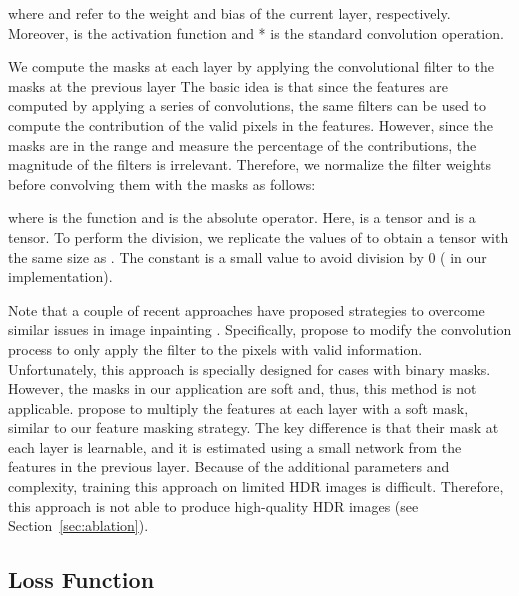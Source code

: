 \vspace{-8pt}

\vspace{-8pt}

\noindent  where  and  refer to the weight and bias of the current layer, respectively. Moreover,  is the activation function and * is the standard convolution operation. 

We compute the masks at each layer by applying the convolutional filter to the masks at the previous layer  The basic idea is that since the features are computed by applying a series of convolutions, the same filters can be used to compute the contribution of the valid pixels in the features. However, since the masks are in the range  and measure the percentage of the contributions, the magnitude of the filters is irrelevant. Therefore, we normalize the filter weights before convolving them with the masks as follows:

\vspace{-2pt}

\vspace{-2pt}

\noindent where  is the  function and  is the absolute operator. Here,  is a  tensor and  is a  tensor. To perform the division, we replicate the values of  to obtain a tensor with the same size as . The constant  is a small value to avoid division by 0 ( in our implementation).

Note that a couple of recent approaches have proposed strategies to overcome similar issues in image inpainting \cite{yu2018free, liu2018image}. Specifically, \citet{liu2018image} propose to modify the convolution process to only apply the filter to the pixels with valid information. Unfortunately, this approach is specially designed for cases with binary masks. However, the masks in our application are soft and, thus, this method is not applicable. \citet{yu2018free} propose to multiply the features at each layer with a soft mask, similar to our feature masking strategy. The key difference is that their mask at each layer is learnable, and it is estimated using a small network from the features in the previous layer. Because of the additional parameters and complexity, training this approach on limited HDR images is difficult. Therefore, this approach is not able to produce high-quality HDR images (see Section~\ref{sec:ablation}).

\subsection{Loss Function}
\label{sec:hybridloss}

